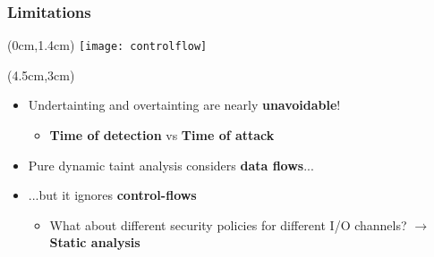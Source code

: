 \begin{frame}
	\frametitle{Limitations}
	\begin{textblock*}{5cm}(0cm,1.4cm)
		\texttt{[image: controlflow]}
	\end{textblock*}
	
	\begin{textblock*}{8cm}(4.5cm,3cm)
		\begin{itemize}
			\item Undertainting and overtainting are nearly \textbf{unavoidable}!
			\begin{itemize}
				\item \textbf{Time of detection} vs \textbf{Time of attack}
			\end{itemize}
			\item Pure dynamic taint analysis considers \textbf{data flows}...
			\item<2-> ...but it ignores \textbf{control-flows}
			\begin{itemize}
				\item<2-> What about different security policies for different I/O channels?
					  \newline $\rightarrow$ \textbf{Static analysis}
			\end{itemize}
		\end{itemize}
	\end{textblock*}
\end{frame}